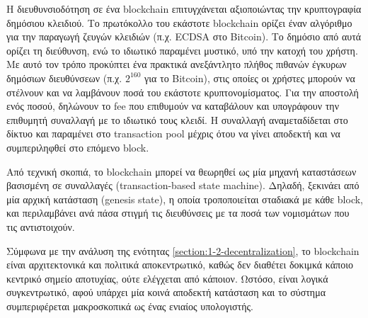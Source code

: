 Η διευθυνσιοδότηση σε ένα blockchain επιτυγχάνεται αξιοποιώντας την κρυπτογραφία δημόσιου κλειδιού. Το πρωτόκολλο του εκάστοτε blockchain ορίζει έναν αλγόριθμο για την παραγωγή ζευγών κλειδιών (π.χ. ECDSA στο Bitcoin). Το δημόσιο από αυτά ορίζει τη διεύθυνση, ενώ το ιδιωτικό παραμένει μυστικό, υπό την κατοχή του χρήστη. Με αυτό τον τρόπο προκύπτει ένα πρακτικά ανεξάντλητο πλήθος πιθανών έγκυρων δημόσιων διευθύνσεων (π.χ. $2^{160}$ για το Bitcoin), στις οποίες οι χρήστες μπορούν να στέλνουν και να λαμβάνουν ποσά του εκάστοτε κρυπτονομίσματος. Για την αποστολή ενός ποσού, δηλώνουν το fee που επιθυμούν να καταβάλουν και υπογράφουν την επιθυμητή συναλλαγή με το ιδιωτικό τους κλειδί. Η συναλλαγή αναμεταδίδεται στο δίκτυο και παραμένει στο transaction pool μέχρις ότου να γίνει αποδεκτή και να συμπεριληφθεί στο επόμενο block.

Από τεχνική σκοπιά, το blockchain μπορεί να θεωρηθεί ως μία μηχανή καταστάσεων βασισμένη σε συναλλαγές (transaction-based state machine). Δηλαδή, ξεκινάει από μία αρχική κατάσταση (genesis state), η οποία τροποποιείται σταδιακά με κάθε block, και περιλαμβάνει ανά πάσα στιγμή τις διευθύνσεις με τα ποσά των νομισμάτων που τις αντιστοιχούν.


Σύμφωνα με την ανάλυση της ενότητας \ref{section:1-2-decentralization}, το blockchain είναι αρχιτεκτονικά και πολιτικά αποκεντρωτικό, καθώς δεν διαθέτει δοκιμκά κάποιο κεντρικό σημείο αποτυχίας, ούτε ελέγχεται από κάποιον. Ωστόσο, είναι λογικά συγκεντρωτικό, αφού υπάρχει μία κοινά αποδεκτή κατάσταση και το σύστημα συμπεριφέρεται μακροσκοπικά ως ένας ενιαίος υπολογιστής.
